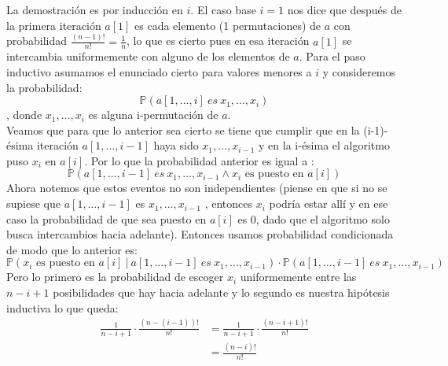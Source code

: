 \documentclass[dcc,uchile]{fcfmcourse}
\begin{document}
\begin{problems}
\begin{enumerate}[a)]
        La demostración es por inducción en $i$. El caso base $i=1$ nos dice que después de la primera iteración $a[1]$ es cada elemento (1 permutaciones) de $a$ con probabilidad $\frac{(n-1)!}{n!} = \frac{1}{n}$, lo que es cierto pues en esa iteración $a[1]$ se intercambia uniformemente con alguno de los elementos de $a$. Para el paso inductivo asumamos el enunciado cierto para valores menores a $i$ y consideremos la probabilidad:
        \begin{equation*}
            \mathbb{P}\left(a[1,\ldots,i]\ es\ x_{1},\ldots,x_{i}\right)
        \end{equation*}
        , donde $x_{1},\ldots,x_{i}$ es alguna i-permutación de $a$.\\
        Veamos que para que lo anterior sea cierto se tiene que cumplir que en la (i-1)-ésima iteración $a[1,\ldots,i-1]$ haya sido $x_{1},\ldots,x_{i-1}$ y en la i-ésima  el algoritmo puso $x_{i}$ en $a[i]$. Por lo que la probabilidad anterior es igual a :
        \begin{equation*}
            \mathbb{P}\left(a[1,\ldots,i-1]\ es\ x_{1},\ldots,x_{i-1} \land \text{$x_{i}$ es puesto en $a[i]$}\right)
        \end{equation*}
        Ahora notemos que estos eventos no son independientes (piense en que si no se supiese que $a[1,\ldots,i-1]$ es $x_{1},\ldots,x_{i-1}$ , entonces $x_{i}$ podría estar allí y en ese caso la probabilidad de que sea puesto en $a[i]$ es 0, dado que el algoritmo solo busca intercambios hacia adelante). Entonces usamos probabilidad condicionada de modo que lo anterior es:
        \begin{equation*}
            \mathbb{P}\left(\text{$x_{i}$ es puesto en $a[i]$}\ |\ a[1,\ldots,i-1]\ es\ x_{1},\ldots,x_{i-1}\right) \cdot \mathbb{P}\left(a[1,\ldots,i-1]\ es\ x_{1},\ldots,x_{i-1}\right)
        \end{equation*}
        Pero lo primero es la probabilidad de escoger $x_{i}$ uniformemente entre las $n-i+1$ posibilidades que hay hacia adelante y lo segundo es nuestra hipótesis inductiva lo que queda:
        \begin{align*}
            \frac{1}{n-i+1}\cdot\frac{(n-(i-1))!}{n!} &= \frac{1}{n-i+1}\cdot\frac{(n-i+1)!}{n!}\\
            &= \frac{(n-i)!}{n!}
        \end{align*}
\end{enumerate}
\\

\\
\end{problems}
\end{document}
